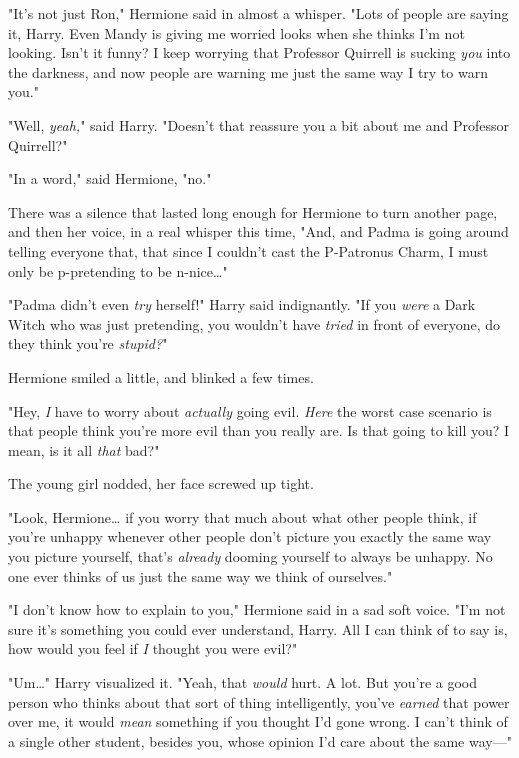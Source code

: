 "It's not just Ron," Hermione said in almost a whisper. "Lots of people are 
saying it, Harry. Even Mandy is giving me worried looks when she thinks I'm not 
looking. Isn't it funny? I keep worrying that Professor Quirrell is sucking 
\emph{you} into the darkness, and now people are warning me just the same way I 
try to warn you."

"Well, \emph{yeah,}" said Harry. "Doesn't that reassure you a bit about me and 
Professor Quirrell?"

"In a word," said Hermione, "no."

There was a silence that lasted long enough for Hermione to turn another page, 
and then her voice, in a real whisper this time, "And, and Padma is going 
around telling everyone that, that since I couldn't cast the P-Patronus Charm, 
I must only be p-pretending to be n-nice{\ldots}"

"Padma didn't even \emph{try} herself!" Harry said indignantly. "If you 
\emph{were} a Dark Witch who was just pretending, you wouldn't have 
\emph{tried} in front of everyone, do they think you're \emph{stupid?}"

Hermione smiled a little, and blinked a few times.

"Hey, \emph{I} have to worry about \emph{actually} going evil. \emph{Here} the 
worst case scenario is that people think you're more evil than you really are. 
Is that going to kill you? I mean, is it all \emph{that} bad?"

The young girl nodded, her face screwed up tight.

"Look, Hermione{\ldots} if you worry that much about what other people think, 
if you're unhappy whenever other people don't picture you exactly the same way 
you picture yourself, that's \emph{already} dooming yourself to always be 
unhappy. No one ever thinks of us just the same way we think of ourselves."

"I don't know how to explain to you," Hermione said in a sad soft voice. "I'm 
not sure it's something you could ever understand, Harry. All I can think of to 
say is, how would you feel if \emph{I} thought you were evil?"

"Um{\ldots}" Harry visualized it. "Yeah, that \emph{would} hurt. A lot. But 
you're a good person who thinks about that sort of thing intelligently, you've 
\emph{earned} that power over me, it would \emph{mean} something if you thought 
I'd gone wrong. I can't think of a single other student, besides you, whose 
opinion I'd care about the same way---"


